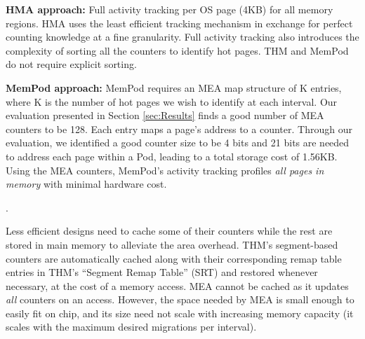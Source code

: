 	\textbf{HMA approach:} Full activity tracking per OS page (4KB) for all memory regions. HMA uses the least efficient tracking mechanism in exchange for perfect counting knowledge at a fine granularity. Full activity tracking also introduces the complexity of sorting all the counters to identify hot pages. THM and MemPod do not require explicit sorting.
	
	\textbf{MemPod approach:} MemPod requires an MEA map structure of K entries, where K is the number of hot pages we wish to identify at each interval. Our evaluation presented in Section \ref{sec:Results} finds a good number of MEA counters to be 128. Each entry maps a page's address to a counter. Through our evaluation, we identified a good counter size to be 4 bits and 21 bits are needed to address each page within a Pod, leading to a total storage cost of 1.56KB. Using the MEA counters, MemPod's activity tracking profiles \textit{all pages in memory} with minimal hardware cost. 

.
	

Less efficient designs need to cache some of their counters while the rest are stored in main memory to alleviate the area overhead. THM's segment-based 
counters are automatically cached along with their corresponding remap table entries in THM's ``Segment Remap Table'' (SRT) and restored whenever necessary, at the cost of a memory access. 
MEA cannot be cached as it updates \textit{all} counters on an access. 
However, the space needed by MEA is small enough to easily fit on chip,
and its size need not scale with increasing memory capacity (it scales with
the maximum desired migrations per interval).


